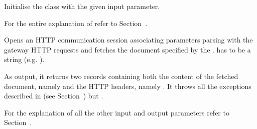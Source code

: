 \documentclass{ozdoc}
\begin{document}
\begin{mozartDESCRIPTION}
\mozartENTRYHASCODE
\begin{mozartSYNOPSIS}
\begin{mozartCODEDISPLAY}\mozartFACETEXT{)}\end{mozartCODEDISPLAY}
\end{mozartSYNOPSIS}
\mozartITEM Initialise the class with the given  input parameter.

  \mozartEMPTY
For the entire explanation of  refer to Section~. \mozartEMPTY
{}\mozartENTRYHASCODE
\begin{mozartSYNOPSIS}
\begin{mozartCODEDISPLAY}\mozartFACETEXT{\mozartSPACE{}}\mozartFACETEXT{\mozartSPACE{}}\mozartFACETEXT{\mozartSPACE{}}\mozartFACETEXT{)}\end{mozartCODEDISPLAY}
\end{mozartSYNOPSIS}
\mozartITEM Opens an HTTP communication session associating  parameters parsing with the gateway  HTTP requests and fetches the document specified by the .  has to be a  string (e.g. ).

As output, it returns two records containing both the content of the fetched document, namely  and the HTTP headers, namely . It throws all the exceptions described in (see Section~) but .  

For the explanation of all the other input and output parameters refer to Section~. \mozartEMPTY
\end{mozartDESCRIPTION}


\end{document}
